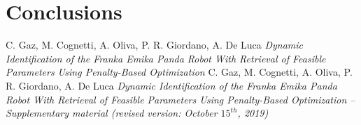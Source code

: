 \documentclass{article}
\begin{document}
\section{Conclusions}

\clearpage

\begin{thebibliography}{}
C. Gaz, M. Cognetti, A. Oliva, P. R. Giordano, A. De Luca
\emph {Dynamic Identification of the Franka Emika Panda Robot With Retrieval of Feasible Parameters Using Penalty-Based Optimization}
C. Gaz, M. Cognetti, A. Oliva, P. R. Giordano, A. De Luca
\emph {Dynamic Identification of the Franka Emika Panda Robot With Retrieval of Feasible Parameters Using Penalty-Based Optimization – Supplementary material (revised version: October $15^{th}$, 2019)}
\end{thebibliography}
\end{document}
